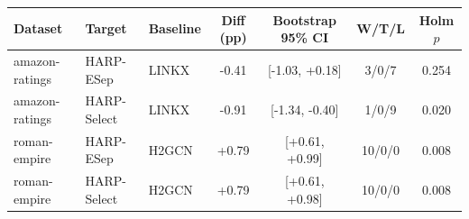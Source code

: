 \begin{tabular}{lllcccc}
\toprule
Dataset & Target & Baseline & Diff (pp) & Bootstrap 95\% CI & W/T/L & Holm $p$ \\
\midrule
amazon-ratings & HARP-ESep & LINKX & -0.41 & [-1.03, +0.18] & 3/0/7 & 0.254 \\
amazon-ratings & HARP-Select & LINKX & -0.91 & [-1.34, -0.40] & 1/0/9 & 0.020 \\
roman-empire & HARP-ESep & H2GCN & +0.79 & [+0.61, +0.99] & 10/0/0 & 0.008 \\
roman-empire & HARP-Select & H2GCN & +0.79 & [+0.61, +0.98] & 10/0/0 & 0.008 \\
\bottomrule
\end{tabular}
